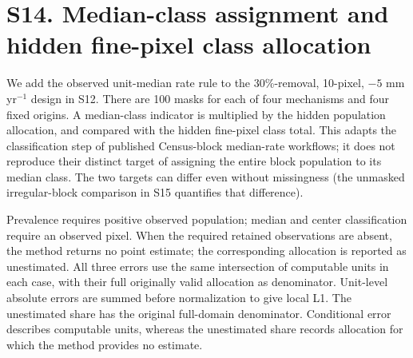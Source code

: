 \documentclass[10pt,a4paper]{article}
\begin{document}
\section*{S14. Median-class assignment and hidden fine-pixel class allocation}
We add the observed unit-median rate rule to the 30\%-removal, 10-pixel, $-5$ mm yr$^{-1}$ design in S12. There are 100 masks for each of four mechanisms and four fixed origins. A median-class indicator is multiplied by the hidden population allocation, and compared with the hidden fine-pixel class total. This adapts the classification step of published Census-block median-rate workflows; it does not reproduce their distinct target of assigning the entire block population to its median class. The two targets can differ even without missingness (the unmasked irregular-block comparison in S15 quantifies that difference).

Prevalence requires positive observed population; median and center classification require an observed pixel. When the required retained observations are absent, the method returns no point estimate; the corresponding allocation is reported as unestimated. All three errors use the same intersection of computable units in each case, with their full originally valid allocation as denominator. Unit-level absolute errors are summed before normalization to give local L1. The unestimated share has the original full-domain denominator. Conditional error describes computable units, whereas the unestimated share records allocation for which the method provides no estimate.
\end{document}
